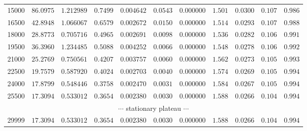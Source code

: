 \begin{table}[H]
\begin{adjustbox}{max width=\linewidth}
\begin{tabular}{rrrrrrrrrrr}
         15000 & $86.0975$      & $1.212989$  & $0.7499$    & $0.004642$  & $0.0543$    & $0.000000$ & $1.501$ & $0.0300$ & $0.107$ & $0.986$ \\
         16500 & $42.8948$      & $1.066067$  & $0.6579$    & $0.002672$  & $0.0150$    & $0.000000$ & $1.514$ & $0.0293$ & $0.107$ & $0.988$ \\
         18000 & $28.8773$      & $0.705716$  & $0.4965$    & $0.002691$  & $0.0098$    & $0.000000$ & $1.536$ & $0.0282$ & $0.106$ & $0.991$ \\
         19500 & $36.3960$      & $1.234485$  & $0.5088$    & $0.004252$  & $0.0066$    & $0.000000$ & $1.548$ & $0.0278$ & $0.106$ & $0.992$ \\
         21000 & $25.2769$      & $0.750561$  & $0.4207$    & $0.003757$  & $0.0060$    & $0.000000$ & $1.562$ & $0.0273$ & $0.105$ & $0.993$ \\
         22500 & $19.7579$      & $0.587920$  & $0.4024$    & $0.002703$  & $0.0040$    & $0.000000$ & $1.574$ & $0.0269$ & $0.105$ & $0.994$ \\
         24000 & $17.8799$      & $0.548446$  & $0.3758$    & $0.002470$  & $0.0031$    & $0.000000$ & $1.584$ & $0.0267$ & $0.105$ & $0.994$ \\
         25500 & $17.3094$      & $0.533012$  & $0.3654$    & $0.002380$  & $0.0030$    & $0.000000$ & $1.588$ & $0.0266$ & $0.104$ & $0.994$ \\
         \multicolumn{11}{c}{$\cdots$ stationary plateau $\cdots$} \\
         29999 & $17.3094$      & $0.533012$  & $0.3654$    & $0.002380$  & $0.0030$    & $0.000000$ & $1.588$ & $0.0266$ & $0.104$ & $0.994$ \\
        \hline
    \end{tabular}
    \end{adjustbox}
\end{table}

\vspace{-0.15cm}

